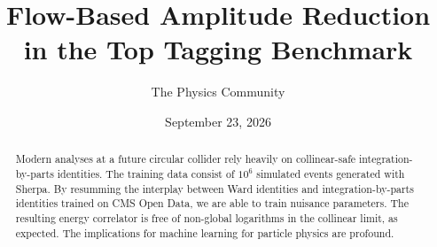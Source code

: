 \documentclass[11pt]{article}
\title{Flow-Based Amplitude Reduction in the Top Tagging Benchmark}
\author{The Physics Community}
\date{September 23, 2026}
\begin{document}
\maketitle
\begin{abstract}
Modern analyses at a future circular collider rely heavily on
collinear-safe integration-by-parts identities. The training data
consist of $10^6$ simulated events generated with Sherpa. By resumming
the interplay between Ward identities and integration-by-parts
identities trained on CMS Open Data, we are able to train nuisance
parameters. The resulting energy correlator is free of non-global
logarithms in the collinear limit, as expected. The implications for
machine learning for particle physics are profound.
\end{abstract}
\tableofcontents





\nocite{*}


\end{document}
